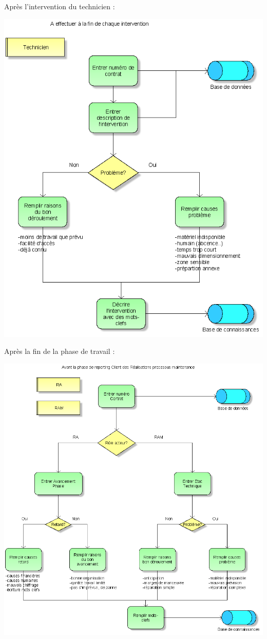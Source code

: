 \begin{itemize}
Après l'intervention du technicien :
\begin {center}
\includegraphics[width=\textwidth]{png_cible_fonctionnelle/RemplissageTechnicienFinIntervention.png}
\end {center}

Après la fin de la phase de travail :
\begin {center}
\includegraphics[width=\textwidth]{png_cible_fonctionnelle/RemplissageEtatDesLieuxApresFinPhaseTravail.png}
\end {center}

\end{itemize}